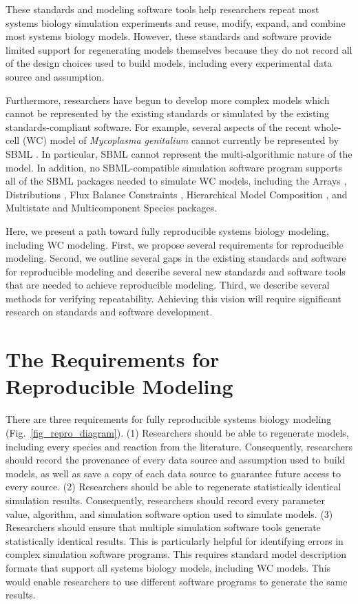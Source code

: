 \documentclass[journal,transmag,twoside]{IEEEtran}
\begin{document}
These standards and modeling software tools help researchers repeat most systems biology simulation experiments and reuse, modify, expand, and combine most systems biology models. However, these standards and software provide limited support for regenerating models themselves because they do not record all of the design choices used to build models, including every experimental data source and assumption.

Furthermore, researchers have begun to develop more complex models which cannot be represented by the existing standards or simulated by the existing standards-compliant software. For example, several aspects of the recent whole-cell (WC) model of \textit{Mycoplasma genitalium} \cite{Karr2012} cannot currently be represented by SBML \cite{Waltemath2016}. In particular, SBML cannot represent the multi-algorithmic nature of the model. In addition, no SBML-compatible simulation software program supports all of the SBML packages needed to simulate WC models, including the Arrays \cite{watanabe2016efficient}, Distributions \cite{Moodie2015}, Flux Balance Constraints \cite{olivier2015fbc}, Hierarchical Model Composition \cite{smith2015sbml}, and Multistate and Multicomponent Species \cite{SBMLMulti} packages.

Here, we present a path toward fully reproducible systems biology modeling, including WC modeling. First, we propose several requirements for reproducible modeling. Second, we outline several gaps in the existing standards and software for reproducible modeling and describe several new standards and software tools that are needed to achieve reproducible modeling. Third, we describe several methods for verifying repeatability. Achieving this vision will require significant research on standards and software development.

\section{The Requirements for Reproducible Modeling}

There are three requirements for fully reproducible systems biology modeling (Fig.~\ref{fig_repro_diagram}). (1) Researchers should be able to regenerate models, including every species and reaction from the literature. Consequently, researchers should record the provenance of every data source and assumption used to build models, as well as save a copy of each data source to guarantee future access to every source. (2) Researchers should be able to regenerate statistically identical simulation results. Consequently, researchers should record every parameter value, algorithm, and simulation software option used to simulate models. (3) Researchers should ensure that multiple simulation software tools generate statistically identical results. This is particularly helpful for identifying errors in complex simulation software programs. This requires standard model description formats that support all systems biology models, including WC models. This would enable researchers to use different software programs to generate the same results.
\end{document}
